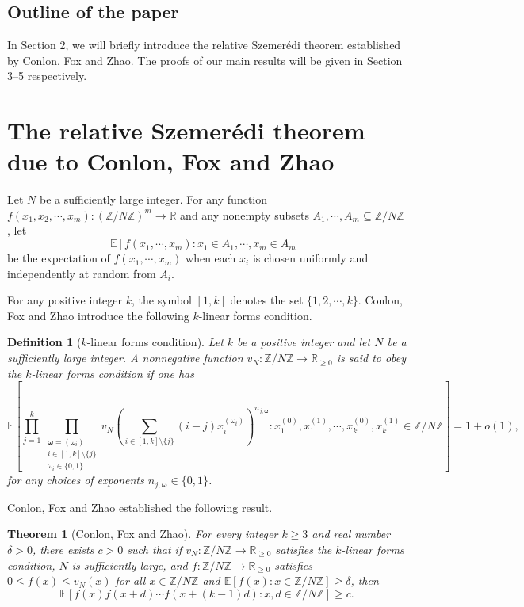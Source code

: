 \documentclass[12pt]{amsart}
\theoremstyle{plain}
\newtheorem{theorem}{Theorem}[section]
\newtheorem{definition}{Definition}
\theoremstyle{remark}
\begin{document}
	
	\subsection{Outline of the paper} In Section 2, we will briefly introduce the relative Szemer\'edi theorem established by Conlon, Fox and Zhao. The proofs of our main results will be given in Section 3--5 respectively. 
	
	\section{The relative Szemer\'edi theorem due to Conlon, Fox and Zhao}
	\setcounter{lemma}{0}
	\setcounter{theorem}{0}
	\setcounter{equation}{0}
	\setcounter{conjecture}{0}
	\setcounter{remark}{0}
	\setcounter{corollary}{0}
	
	Let $N$ be a sufficiently large integer. For any function $f(x_1,x_2,\cdots, x_m): \left(\mathbb{Z}/N\mathbb{Z}\right)^m\rightarrow\mathbb{R}$ and any nonempty subsets $A_1,\cdots,A_m\subseteq \mathbb{Z}/N\mathbb{Z}$, let 
	$$\mathbb{E}\left[f(x_1,\cdots,x_m): x_1\in A_1,\cdots, x_m\in A_m\right]$$
	be the expectation of $f(x_1,\cdots,x_m)$ when each $x_i$ is chosen uniformly and independently at random from $A_i$. 
	
	For any positive integer $k$, the symbol $[1,k]$ denotes the set $\{1,2,\cdots, k\}$. Conlon, Fox and Zhao  \cite[Definition 2.2]{CFZ} introduce the following $k$-linear forms condition.
	
	\begin{definition}[$k$-linear forms condition]\label{Def. linear forms condition}
		Let $k$ be a positive integer and let $N$ be a sufficiently large integer. A nonnegative function $v_N: \mathbb{Z}/N\mathbb{Z}\rightarrow\mathbb{R}_{\ge 0}$ is said to obey the $k$-linear forms condition if one has 
		$$\mathbb{E}\left[\prod_{j=1}^{k}\prod_{\substack{{\bm \omega}=(\omega_i)\\ i\in[1,k]\setminus\{j\} \\ \omega_i\in \{0,1\}}}v_N\left(\sum_{i\in[1,k]\setminus\{j\}}(i-j)x_i^{(\omega_i)}\right)^{n_{j,{\bm \omega}}}: x_1^{(0)},x_1^{(1)},\cdots, x_k^{(0)},x_k^{(1)}\in\mathbb{Z}/N\mathbb{Z}\right]=1+o(1),$$
		for any choices of exponents $n_{j,{\bm \omega}}\in\{0,1\}$. 
	\end{definition}
	
	Conlon, Fox and Zhao \cite[Theorem 2.4]{CFZ} established the following result. 
	
	\begin{theorem}[Conlon, Fox and Zhao]\label{Thm. CFZ}
		For every integer $k\ge3$ and real number $\delta>0$, there exists $c>0$ such that if $v_N: \mathbb{Z}/N\mathbb{Z}\rightarrow\mathbb{R}_{\ge 0}$ satisfies the $k$-linear forms condition, $N$ is sufficiently large, and $f: \mathbb{Z}/N\mathbb{Z}\rightarrow\mathbb{R}_{\ge 0}$ satisfies $0\le f(x)\le v_N(x)$ for all $x\in \mathbb{Z}/N\mathbb{Z}$ and $\mathbb{E}[f(x): x\in \mathbb{Z}/N\mathbb{Z}]\ge \delta$, then 
		$$\mathbb{E}\left[f(x)f(x+d)\cdots f(x+(k-1)d): x, d\in\mathbb{Z}/N\mathbb{Z}\right]\ge c.$$
	\end{theorem}
	
\end{document}
